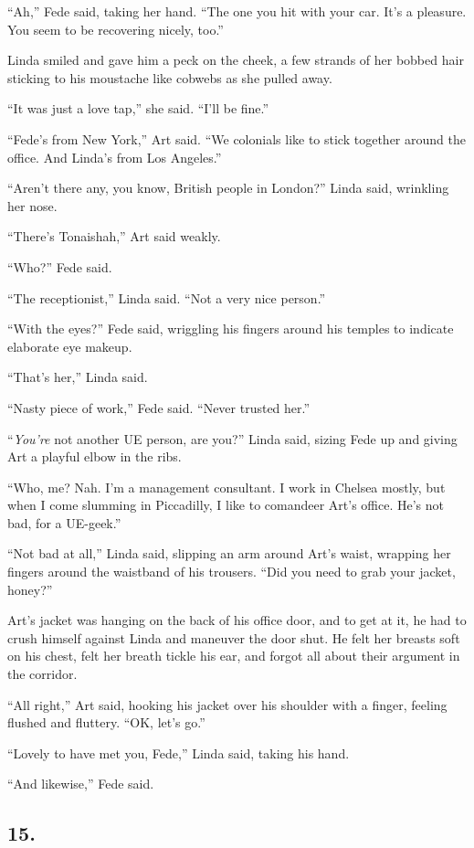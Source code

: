 “Ah,” Fede said, taking her hand. “The one you hit with your car.
It’s a pleasure. You seem to be recovering nicely, too.”

Linda smiled and gave him a peck on the cheek, a few strands of her
bobbed hair sticking to his moustache like cobwebs as she pulled
away.

“It was just a love tap,” she said. “I’ll be fine.”

“Fede’s from New York,” Art said. “We colonials like to stick
together around the office. And Linda’s from Los Angeles.”

“Aren’t there any, you know, British people in London?” Linda said,
wrinkling her nose.

“There’s Tonaishah,” Art said weakly.

“Who?” Fede said.

“The receptionist,” Linda said. “Not a very nice person.”

“With the eyes?” Fede said, wriggling his fingers around his
temples to indicate elaborate eye makeup.

“That’s her,” Linda said.

“Nasty piece of work,” Fede said. “Never trusted her.”

“\emph{You’re} not another UE person, are you?” Linda said, sizing
Fede up and giving Art a playful elbow in the ribs.

“Who, me? Nah. I’m a management consultant. I work in Chelsea
mostly, but when I come slumming in Piccadilly, I like to comandeer
Art’s office. He’s not bad, for a UE-geek.”

“Not bad at all,” Linda said, slipping an arm around Art’s waist,
wrapping her fingers around the waistband of his trousers. “Did you
need to grab your jacket, honey?”

Art’s jacket was hanging on the back of his office door, and to get
at it, he had to crush himself against Linda and maneuver the door
shut. He felt her breasts soft on his chest, felt her breath tickle
his ear, and forgot all about their argument in the corridor.

“All right,” Art said, hooking his jacket over his shoulder with a
finger, feeling flushed and fluttery. “OK, let’s go.”

“Lovely to have met you, Fede,” Linda said, taking his hand.

“And likewise,” Fede said.

\subsection{15.}

